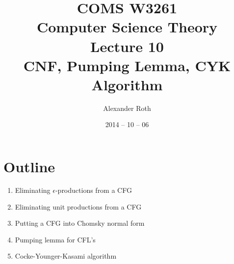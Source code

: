 \documentclass[]{article}
\begin{document}
\newcommand*{\xml}[1]{\texttt{<#1>}}
\theoremstyle{definition}
\newtheorem{thm}{Theorem}

\title{COMS W3261 \\ Computer Science Theory \\ Lecture 10\\ CNF, Pumping Lemma, 
CYK Algorithm}
\author{Alexander Roth}
\date{2014 -- 10 -- 06}
\maketitle

\section*{Outline}
  \begin{enumerate}
    \item Eliminating $\epsilon$-productions from a CFG
    \item Eliminating unit productions from a CFG
    \item Putting a CFG into Chomsky normal form
    \item Pumping lemma for CFL's
    \item Cocke-Younger-Kasami algorithm
  \end{enumerate}
    
\end{document}
